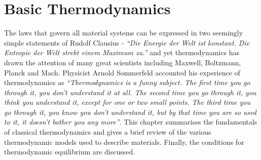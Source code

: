 \chapter{Basic Thermodynamics} \label{chap:mathematics}

The laws that govern all material systems can be expressed in two seemingly simple statements of Rudolf Clausius - \emph{``Die Energie der Welt ist konstant. Die Entropie der Welt strebt einem Maximum zu.''}   and yet thermodynamics has drawn the attention of many great scientists including Maxwell, Boltzmann, Planck and  Mach. Physicist Arnold Sommerfeld accounted his experience of thermodynamics as \emph{``Thermodynamics is a funny subject. The first time you go through it, you don't understand it at all. The second time you go through it, you think you understand it, except for one or two small points. The third time you go through it, you know you don't understand it, but by that time you are so used to it, it doesn't bother you any more''}. This chapter summarises the fundamentals of classical thermodynamics and gives a brief review of the various thermodynamic models used to describe materials. Finally, the conditions for thermodynamic equilibrium are discussed.

